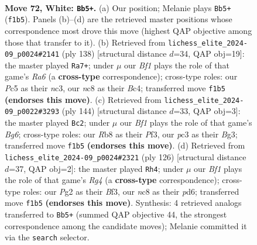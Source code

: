 \documentclass[11pt]{article}
\begin{document}
\clearpage

\begin{figure}[p]\centering
\begin{subfigure}{0.46\textwidth}\centering
\resizebox{\linewidth}{!}{%
\newchessgame
\chessboard[
  setfen={1Rn5/3k3p/P7/2P5/5r2/2p4P/2P3P1/4KB2 w - - 7 72},
  showmover=false,
  pgfstyle=straightmove, color=movearrow, markmove={f1-b5}
]}
\caption{}
\end{subfigure}\hfill
\begin{subfigure}{0.46\textwidth}\centering
\resizebox{\linewidth}{!}{%
\newchessgame
\chessboard[
  setfen={8/6k1/R7/5pp1/2Br4/1Pn3KP/8/8 w - - 7 70},
  showmover=false,
  pgfstyle=straightmove, color=movearrow, markmove={a6-a7}
]}
\caption{}
\end{subfigure}
\\[4pt]
\begin{subfigure}{0.46\textwidth}\centering
\resizebox{\linewidth}{!}{%
\newchessgame
\chessboard[
  setfen={8/8/1r4Bp/7P/3k1P2/5PB1/K2p4/8 w - - 0 73},
  showmover=false,
  pgfstyle=straightmove, color=movearrow, markmove={g6-c2}
]}
\caption{}
\end{subfigure}\hfill
\begin{subfigure}{0.46\textwidth}\centering
\resizebox{\linewidth}{!}{%
\newchessgame
\chessboard[
  setfen={8/5n2/3p4/1P1P1k2/2P3R1/5B1p/r7/5K2 w - - 4 64},
  showmover=false,
  pgfstyle=straightmove, color=movearrow, markmove={g4-h4}
]}
\caption{}
\end{subfigure}
\caption{\textbf{Move 72, White: \texttt{Bb5+}.} (a) Our position; Melanie plays \texttt{Bb5+} (\texttt{f1b5}). Panels (b)--(d) are the retrieved master positions whose correspondence most drove this move (highest QAP objective among those that transfer to it). (b) Retrieved from \texttt{lichess\_elite\_2024-09\_p0024\#2141} (ply 138) [structural distance $d$=34, QAP obj=19]: the master played \texttt{Ra7+}; under $\mu$ our \emph{Bf1} plays the role of that game's \emph{Ra6} (a \textbf{cross-type} correspondence); cross-type roles: our \emph{P}c5 as their \emph{n}c3, our \emph{n}c8 as their \emph{B}c4; transferred move \texttt{f1b5} \textbf{(endorses this move)}. (c) Retrieved from \texttt{lichess\_elite\_2024-09\_p0022\#3293} (ply 144) [structural distance $d$=33, QAP obj=3]: the master played \texttt{Bc2}; under $\mu$ our \emph{Bf1} plays the role of that game's \emph{Bg6}; cross-type roles: our \emph{R}b8 as their \emph{P}f3, our \emph{p}c3 as their \emph{B}g3; transferred move \texttt{f1b5} \textbf{(endorses this move)}. (d) Retrieved from \texttt{lichess\_elite\_2024-09\_p0024\#2321} (ply 126) [structural distance $d$=37, QAP obj=2]: the master played \texttt{Rh4}; under $\mu$ our \emph{Bf1} plays the role of that game's \emph{Rg4} (a \textbf{cross-type} correspondence); cross-type roles: our \emph{P}g2 as their \emph{B}f3, our \emph{n}c8 as their \emph{p}d6; transferred move \texttt{f1b5} \textbf{(endorses this move)}. Synthesis: 4 retrieved analogs transferred to \texttt{Bb5+} (summed QAP objective 44, the strongest correspondence among the candidate moves); Melanie committed it via the \texttt{search} selector.}
\label{fig:thought-m142}
\end{figure}
\end{document}
